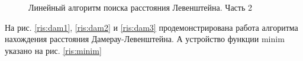 \documentclass[a4paper, 14pt]{article}
\begin{document}
\begin{figure}[pt!]
\caption{Линейный алгоритм поиска расстояния Левенштейна. Часть 2}
\label{ris:matr2}
\end{figure}

\newpage
На рис. \ref{ris:dam1}, \ref{ris:dam2} и \ref{ris:dam3} продемонстрирована работа алгоритма нахождения расстояния Дамерау-Левенштейна. А устройство функции minim указано на рис.  \ref{ris:minim}
\end{document}
